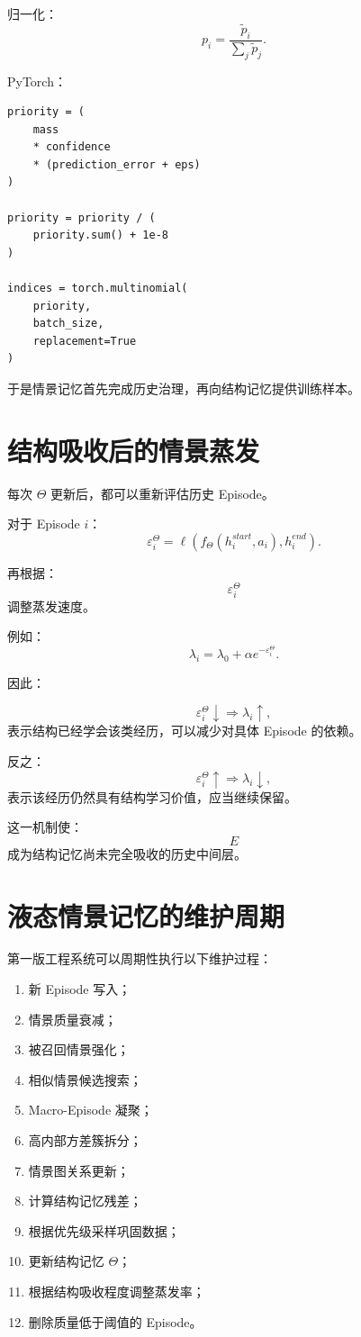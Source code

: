 归一化：
\[
p_i
=
\frac{
\tilde p_i
}{
\sum_j \tilde p_j
}.
\]

PyTorch：

\begin{verbatim}
priority = (
    mass
    * confidence
    * (prediction_error + eps)
)

priority = priority / (
    priority.sum() + 1e-8
)

indices = torch.multinomial(
    priority,
    batch_size,
    replacement=True
)
\end{verbatim}

于是情景记忆首先完成历史治理，再向结构记忆提供训练样本。

\section{结构吸收后的情景蒸发}

每次 $\Theta$ 更新后，都可以重新评估历史 Episode。

对于 Episode $i$：
\[
\varepsilon_i^\Theta
=
\ell
\left(
f_\Theta(h_i^{start},a_i),
h_i^{end}
\right).
\]

再根据：
\[
\varepsilon_i^\Theta
\]
调整蒸发速度。

例如：
\[
\lambda_i
=
\lambda_0
+
\alpha
e^{-\varepsilon_i^\Theta}.
\]

因此：

\[
\varepsilon_i^\Theta\downarrow
\Rightarrow
\lambda_i\uparrow,
\]
表示结构已经学会该类经历，可以减少对具体 Episode 的依赖。

反之：
\[
\varepsilon_i^\Theta\uparrow
\Rightarrow
\lambda_i\downarrow,
\]
表示该经历仍然具有结构学习价值，应当继续保留。

这一机制使：
\[
\boxed{
E
}
\]
成为结构记忆尚未完全吸收的历史中间层。

\section{液态情景记忆的维护周期}

第一版工程系统可以周期性执行以下维护过程：

\begin{enumerate}
    \item 新 Episode 写入；
    \item 情景质量衰减；
    \item 被召回情景强化；
    \item 相似情景候选搜索；
    \item Macro-Episode 凝聚；
    \item 高内部方差簇拆分；
    \item 情景图关系更新；
    \item 计算结构记忆残差；
    \item 根据优先级采样巩固数据；
    \item 更新结构记忆 $\Theta$；
    \item 根据结构吸收程度调整蒸发率；
    \item 删除质量低于阈值的 Episode。
\end{enumerate}

